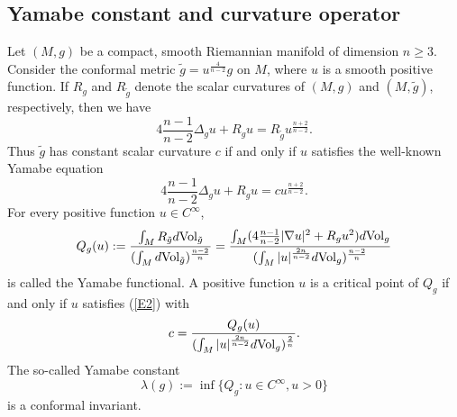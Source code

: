 \documentclass[12pt, twoside]{article}
\theoremstyle{definition}
\numberwithin{equation}{section}
\def \De {\Delta}
\def \la {\lambda}
\def\na {\nabla}
\begin{document}
\subsection{Yamabe constant  and curvature operator }
Let $(M,g)$ be a compact, smooth Riemannian manifold of dimension $n\geq 3$. Consider the conformal metric $\tilde{g}=u^{\frac{4}{n-2}}g$ on $M$, where $u$ is a smooth positive function. If $R_{g}$ and $R_{\tilde{g}}$ denote the scalar curvatures of $(M,g)$ and $(M,\tilde{g})$, respectively, then we have
\begin{equation}
4\frac{n-1}{n-2}\De_{g}u+R_{g}u=R_{\tilde{g}}u^{\frac{n+2}{n-2}}.
\end{equation}
Thus $\tilde{g}$ has constant scalar curvature $c$ if and only if $u$ satisfies the well-known Yamabe equation
\begin{equation}\label{E2}
4\frac{n-1}{n-2}\De_{g}u+R_{g}u=cu^{\frac{n+2}{n-2}}.
\end{equation}
For every positive function $u\in C^{\infty}$,
\begin{equation*}
Q_{g}(u):=\frac{\int_{M}R_{\tilde{ g}}d{\rm{Vol}}_{ \tilde{g}}      }   { (\int_{M}d{\rm{Vol}}_{ \tilde{g}})^{\frac{n-2}{n} }      }= \frac{\int_{M}(4\frac{n-1}{n-2}|\na u|^{2}+R_{g}u^{2})d{\rm{Vol}}_{g}      }   { (\int_{M} |u|^{\frac{2n}{n-2}}d{\rm{Vol}}_{g})^{\frac{n-2}{n} } }
\end{equation*}
is called the Yamabe functional. A positive function $u$ is a critical point of $Q_{g}$ if and only if $u$ satisfies (\ref{E2}) with $$c=\frac{Q_{g}(u)} { (\int_{M} |u|^{\frac{2n}{n-2}}d{\rm{Vol}}_{g})^{\frac{2}{n} } }.$$ The so-called Yamabe constant
$$\la(g):=\inf\{Q_{g}:u\in C^{\infty}, u>0 \}$$ 
is a conformal invariant. 
\end{document}
